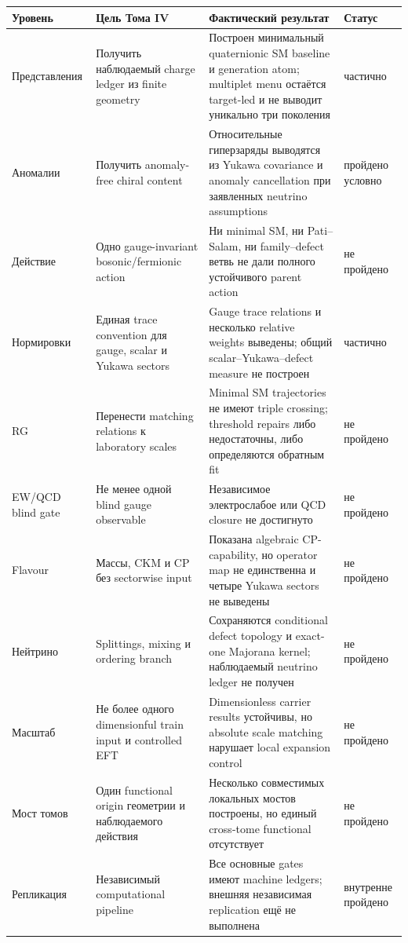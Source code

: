 \begin{center}
\footnotesize
\setlength{\tabcolsep}{2pt}
\begin{longtable}{>{\raggedright\arraybackslash}p{}>{\raggedright\arraybackslash}p{}>{\raggedright\arraybackslash}p{}>{\raggedright\arraybackslash}p{}}
\toprule
Уровень & Цель Тома IV & Фактический результат & Статус \\
\midrule
\endhead
Представления & Получить наблюдаемый charge ledger из finite geometry & Построен минимальный quaternionic SM baseline и generation atom; multiplet menu остаётся target-led и не выводит уникально три поколения & частично \\
Аномалии & Получить anomaly-free chiral content & Относительные гиперзаряды выводятся из Yukawa covariance и anomaly cancellation при заявленных neutrino assumptions & пройдено условно \\
Действие & Одно gauge-invariant bosonic/fermionic action & Ни minimal SM, ни Pati--Salam, ни family--defect ветвь не дали полного устойчивого parent action & не пройдено \\
Нормировки & Единая trace convention для gauge, scalar и Yukawa sectors & Gauge trace relations и несколько relative weights выведены; общий scalar--Yukawa--defect measure не построен & частично \\
RG & Перенести matching relations к laboratory scales & Minimal SM trajectories не имеют triple crossing; threshold repairs либо недостаточны, либо определяются обратным fit & не пройдено \\
EW/QCD blind gate & Не менее одной blind gauge observable & Независимое электрослабое или QCD closure не достигнуто & не пройдено \\
Flavour & Массы, CKM и CP без sectorwise input & Показана algebraic CP-capability, но operator map не единственна и четыре Yukawa sectors не выведены & не пройдено \\
Нейтрино & Splittings, mixing и ordering branch & Сохраняются conditional defect topology и exact-one Majorana kernel; наблюдаемый neutrino ledger не получен & не пройдено \\
Масштаб & Не более одного dimensionful train input и controlled EFT & Dimensionless carrier results устойчивы, но absolute scale matching нарушает local expansion control & не пройдено \\
Мост томов & Один functional origin геометрии и наблюдаемого действия & Несколько совместимых локальных мостов построены, но единый cross-tome functional отсутствует & не пройдено \\
Репликация & Независимый computational pipeline & Все основные gates имеют machine ledgers; внешняя независимая replication ещё не выполнена & внутренне пройдено \\
\bottomrule
\end{longtable}
\end{center}

